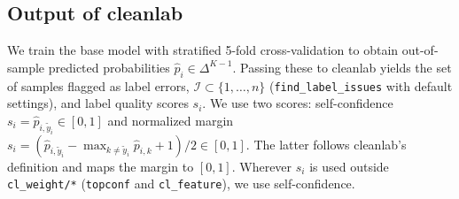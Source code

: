 \documentclass[a4paper,10pt]{article}
\newcommand{\method}[1]{\texttt{#1}}
\newcommand{\cl}{\textsf{cleanlab}}
\begin{document}
\subsection{Output of \cl{}}
We train the base model with stratified 5-fold cross-validation to obtain out-of-sample predicted probabilities $\hat{p}_i \in \Delta^{K-1}$.
Passing these to \cl{} yields the set of samples flagged as label errors, $\mathcal{I} \subset \{1,\dots,n\}$ (\texttt{find\_label\_issues} with default settings), and label quality scores $s_i$.
We use two scores: self-confidence $s_i = \hat{p}_{i,\tilde{y}_i} \in [0,1]$ and normalized margin $s_i = (\hat{p}_{i,\tilde{y}_i} - \max_{k \neq \tilde{y}_i} \hat{p}_{i,k} + 1)/2 \in [0,1]$.
The latter follows \cl{}'s definition and maps the margin to $[0,1]$.
Wherever $s_i$ is used outside \method{cl\_weight/*} (\method{topconf} and \method{cl\_feature}), we use self-confidence.
\end{document}
